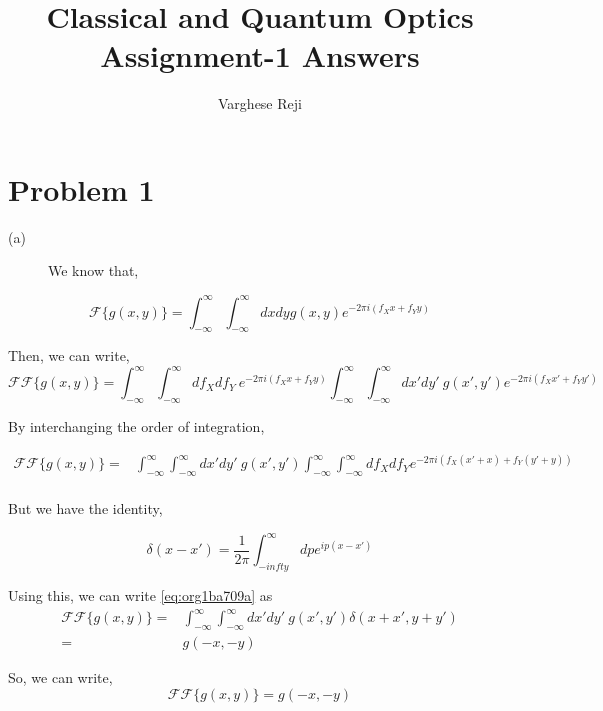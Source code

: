 \documentclass[a4paper,11pt]{article}
\author{Varghese Reji}
\date{}
\title{Classical and Quantum Optics\\\medskip
\large Assignment-1 Answers}
\begin{document}
\maketitle

\section*{Problem 1}
\label{sec:org528eb84}
\begin{description}
\item[{(a)}] We know that,
\end{description}
\begin{equation}
\label{eq:org98e5e05}
\mathcal{F}\{g(x,y)\} = \int_{-\infty}^\infty \int_{-\infty}^\infty dxdy g(x,y) e^{-2\pi i(f_Xx+f_Yy)}
\end{equation}

Then, we can write,
 $$\mathcal{F}\mathcal{F}\{g(x,y)\} = \int_{-\infty}^\infty \int_{-\infty}^\infty df_X df_Y ~e^{-2\pi i(f_Xx+f_Yy)} \int_{-\infty}^\infty \int_{-\infty}^\infty dx'dy' ~g(x',y') e^{-2\pi i(f_Xx'+f_Yy')}$$

By interchanging the order of integration,

 \begin{equation}
\label{eq:org1ba709a}
\begin{split}
\mathcal{F}\mathcal{F}\{g(x,y)\} = & \int_{-\infty}^\infty \int_{-\infty}^\infty dx'dy'~g(x',y') \int_{-\infty}^\infty \int_{-\infty}^\infty df_Xdf_Ye^{-2\pi i(f_X(x'+x)+f_Y(y'+y))} \\
\end{split}
\end{equation}

But we have the identity,

\begin{equation}
\label{eq:org57c866d}
\delta(x-x') = \frac{1}{2\pi} \int_{-infty}^\infty dp e^{ip(x-x')}
\end{equation}

Using this, we can write \ref{eq:org1ba709a} as
 \begin{equation}
\begin{split}
\mathcal{F}\mathcal{F}\{g(x,y)\} = & \int_{-\infty}^\infty \int_{-\infty}^\infty dx'dy'~g(x',y') \delta(x+x',y+y') \\
= & g(-x,-y)
\end{split}
\end{equation}

So, we can write, $$\mathcal{F}\mathcal{F}\{g(x,y)\} = g(-x,-y)$$
\end{document}
